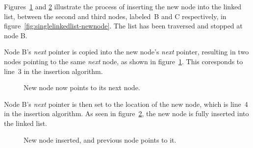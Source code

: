 \documentclass{article}
\begin{document}
  Figures~\ref{fig:singlelinkedlist-insert-step-one} and \ref{fig:singlelinkedlist-insert-step-two} illustrate the process of inserting the new node into the linked list, between the second and third nodes, labeled~B and C respectively, in figure~\ref{fig:singlelinkedlist-newnode}. The list has been traversed and stopped at node B.

  Node B's \emph{next} pointer is copied into the new node's \emph{next} pointer, resulting in two nodes pointing to the same \emph{next} node, as shown in figure~\ref{fig:singlelinkedlist-insert-step-one}. This coresponds to line~3 in the insertion algorithm.
  \begin{figure}[H]
    \centering
    \caption{New node now points to its next node.}
    \label{fig:singlelinkedlist-insert-step-one}
  \end{figure}

  Node B's \emph{next} pointer is then set to the location of the new node, which is line~4 in the insertion algorithm. As seen in figure~\ref{fig:singlelinkedlist-insert-step-two}, the new node is fully inserted into the linked list.
  \begin{figure}[H]
    \centering
    \caption{New node inserted, and previous node points to it.}
    \label{fig:singlelinkedlist-insert-step-two}
  \end{figure}
\end{document}
